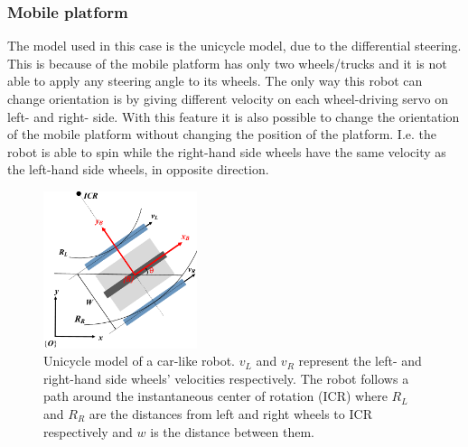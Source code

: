 \subsubsection{Mobile platform}
\label{subsubsec:unicycle}
The model used in this case is the unicycle model, due to the differential steering. 
This is because of the mobile platform has only two wheels/trucks and it is not able to apply any steering angle to its wheels. 
The only way this robot can change orientation is by giving different velocity on each wheel-driving servo on left- and right- side. 
With this feature it is also possible to change the orientation of the mobile platform without changing the position of the platform.
I.e. the robot is able to spin while the right-hand side wheels have the same velocity as the left-hand side wheels, in opposite direction.
\begin{figure}[h!]
\centering
\includegraphics[width=0.4\textwidth]{sections/assets/car-unicycle.png}
\caption{Unicycle model of a car-like robot. 
$v_L$ and $v_R$ represent the left- and right-hand side wheels' velocities respectively. 
The robot follows a path around the instantaneous center of rotation (ICR) where $R_L$ and $R_R$ are the distances from left and right wheels to ICR respectively and $w$ is the distance between them.}
\label{fig:UnicycleModel}
\end{figure} 


